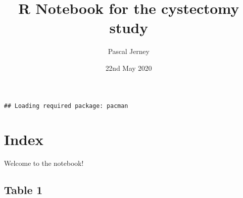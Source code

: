\documentclass[
]{article}
\title{R Notebook for the cystectomy study}
\author{Pascal Jerney}
\date{22nd May 2020}
\begin{document}
\maketitle

\begin{verbatim}
## Loading required package: pacman
\end{verbatim}

\hypertarget{index}{%
\section{Index}\label{index}}

Welcome to the notebook!

\hypertarget{table-1}{%
\subsection{Table 1}\label{table-1}}
\end{document}
